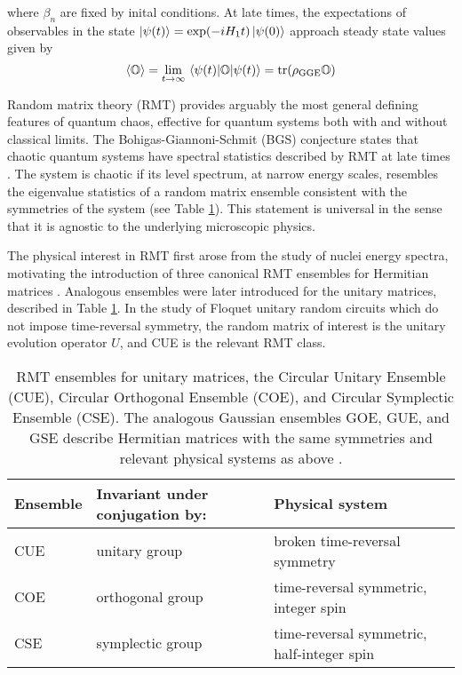 \documentclass[10pt]{article}
\begin{document}
where $\beta_n$ are fixed by inital conditions. At late times, the expectations of observables in the state $\ket{\psi(t)} = \exp(-iH_1t) \ket{\psi(0)}$ approach steady state values given by
\begin{equation}
\ev{\mathbb{O}} 
= \lim_{t\rightarrow\infty} \ev{\mathbb{O}}{\psi(t)} 
= \trace(\rho_\text{GGE} \mathbb{O})
\end{equation}


Random matrix theory (RMT) provides arguably the most general defining features of quantum chaos, effective for quantum systems both with and without classical limits. The Bohigas-Giannoni-Schmit (BGS) conjecture states that chaotic quantum systems have spectral statistics described by RMT at late times \cite{bohigas1984characterization}. The system is chaotic if its level spectrum, at narrow energy scales, resembles the eigenvalue statistics of a random matrix ensemble consistent with the symmetries of the system (see Table \ref{tab_rmt}). This statement is universal in the sense that it is agnostic to the underlying microscopic physics.

The physical interest in RMT first arose from the study of nuclei energy spectra, motivating the introduction of three canonical RMT ensembles for Hermitian matrices \cite{mehta2004random}. Analogous ensembles were later introduced for the unitary matrices, described in Table \ref{tab_rmt}. In the study of Floquet unitary random circuits which do not impose time-reversal symmetry, the random matrix of interest is the unitary evolution operator $U$, and CUE is the relevant RMT class. 


\begin{table}[h]
\centering
\begin{tabular}{l l l}
\\
\hline
Ensemble & Invariant under conjugation by: & Physical system \\
\hline
CUE & unitary group & broken time-reversal symmetry \\
COE & orthogonal group & time-reversal symmetric, integer spin \\
CSE & symplectic group & time-reversal symmetric, half-integer spin \\
\hline
\end{tabular}
\caption{RMT ensembles for unitary matrices, the Circular Unitary Ensemble (CUE), Circular Orthogonal Ensemble (COE), and Circular Symplectic Ensemble (CSE). The analogous Gaussian ensembles GOE, GUE, and GSE describe Hermitian matrices with the same symmetries and relevant physical systems as above \cite{guhr1998random}.}
\label{tab_rmt}
\end{table}
\end{document}
